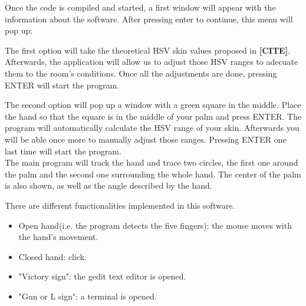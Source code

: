 \documentclass{article}
\begin{document}
Once the code is compiled and started, a first window will appear with the information about the software. After pressing enter to continue, this menu will pop up: 
\begin{center}
\end{center}

\vspace{1cm}
The first option will take the theoretical HSV skin values proposed in \textbf{[CITE]}. Afterwards, the application will allow us to adjust those HSV ranges to adecuate them to the room's conditions. 
Once all the adjustments are done, pressing ENTER will start the program. 

The second option will pop up a window with a green square in the middle. Place the hand so that the square is in the middle of your palm and press ENTER. The program will automatically calculate the HSV range of your skin. Afterwards you will be able once more to manually adjust those ranges. Pressing ENTER one last time will start the program. 
\\
 
The main program will track the hand and trace two circles, the first one around the palm and the second one surrounding the whole hand. The center of the palm is also shown, as well as the angle described by the hand. 

There are different functionalities implemented in this software. 
\begin{itemize}
\item Open hand(i.e. the program detects the five fingers): the mouse moves with the hand's movement.
\item Closed hand: click.
\item "Victory sign": the gedit text editor is opened.
\item "Gun or L sign": a terminal is opened. 
\end{itemize}
\end{document}
